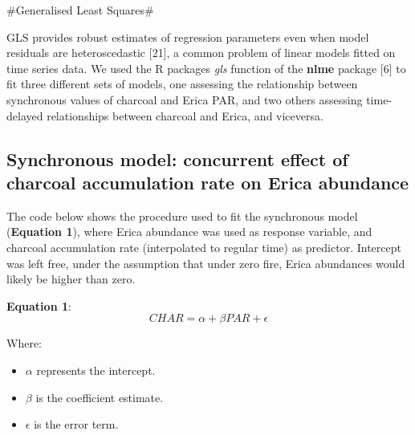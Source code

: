 \documentclass[
]{article}
\newenvironment{Shaded}{\begin{snugshade}}{\end{snugshade}}
\newcommand{\AttributeTok}[1]{\textcolor[rgb]{0.77,0.63,0.00}{#1}}
\newcommand{\CommentTok}[1]{\textcolor[rgb]{0.56,0.35,0.01}{\textit{#1}}}
\newcommand{\DecValTok}[1]{\textcolor[rgb]{0.00,0.00,0.81}{#1}}
\newcommand{\FunctionTok}[1]{\textcolor[rgb]{0.00,0.00,0.00}{#1}}
\newcommand{\NormalTok}[1]{#1}
\newcommand{\OtherTok}[1]{\textcolor[rgb]{0.56,0.35,0.01}{#1}}
\newcommand{\SpecialCharTok}[1]{\textcolor[rgb]{0.00,0.00,0.00}{#1}}
\providecommand{\tightlist}{%
  \setlength{\itemsep}{0pt}\setlength{\parskip}{0pt}}
\begin{document}
\#Generalised Least Squares\#

GLS provides robust estimates of regression parameters even when model
residuals are heteroscedastic {[}21{]}, a common problem of linear
models fitted on time series data. We used the R packages \emph{gls}
function of the \textbf{nlme} package {[}6{]} to fit three different
sets of models, one assessing the relationship between synchronous
values of charcoal and Erica PAR, and two others assessing time-delayed
relationships between charcoal and Erica, and viceversa.

\hypertarget{synchronous-model-concurrent-effect-of-charcoal-accumulation-rate-on-erica-abundance}{%
\subsection{Synchronous model: concurrent effect of charcoal
accumulation rate on Erica
abundance}\label{synchronous-model-concurrent-effect-of-charcoal-accumulation-rate-on-erica-abundance}}

The code below shows the procedure used to fit the synchronous model
(\textbf{Equation 1}), where Erica abundance was used as response
variable, and charcoal accumulation rate (interpolated to regular time)
as predictor. Intercept was left free, under the assumption that under
zero fire, Erica abundances would likely be higher than zero.

\textbf{Equation 1}: \[CHAR = \alpha + \beta PAR + \epsilon\]

Where:

\begin{itemize}
\tightlist
\item
  \(\alpha\) represents the intercept.
\item
  \(\beta\) is the coefficient estimate.
\item
  \(\epsilon\) is the error term.
\end{itemize}

\small

\begin{Shaded}
\end{Shaded}
\end{document}
